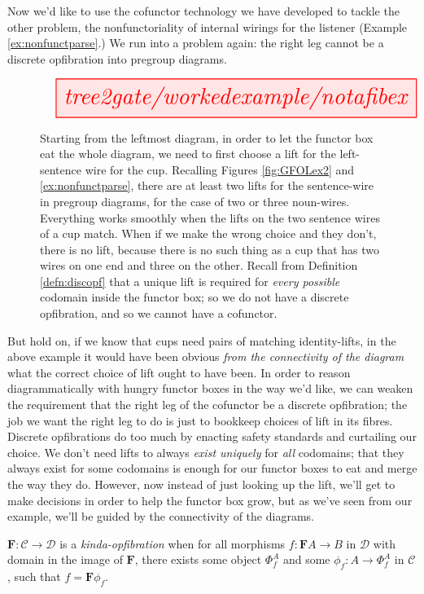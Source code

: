 Now we'd like to use the cofunctor technology we have developed to tackle the other problem, the nonfunctoriality of internal wirings for the listener (Example \ref{ex:nonfunctparse}.) We run into a problem again: the right leg cannot be a discrete opfibration into pregroup diagrams.

\begin{figure}[h!]\label{fig:notafibex}
\centering
\[\resizebox{\textwidth}{!}{\tikzfig{tree2gate/workedexample/notafibex}}\]
\caption{
Starting from the leftmost diagram, in order to let the functor box eat the whole diagram, we need to first choose a lift for the left-sentence wire for the cup. Recalling Figures \ref{fig:GFOLex2} and \ref{ex:nonfunctparse}, there are at least two lifts for the sentence-wire in pregroup diagrams, for the case of two or three noun-wires. Everything works smoothly when the lifts on the two sentence wires of a cup match. When if we make the wrong choice and they don't, there is no lift, because there is no such thing as a cup that has two wires on one end and three on the other. Recall from Definition \ref{defn:discopf} that a unique lift is required for \emph{every possible} codomain inside the functor box; so we do not have a discrete opfibration, and so we cannot have a cofunctor.
}
\end{figure}

But hold on, if we know that cups need pairs of matching identity-lifts, in the above example it would have been obvious \emph{from the connectivity of the diagram} what the correct choice of lift ought to have been. In order to reason diagrammatically with hungry functor boxes in the way we'd like, we can weaken the requirement that the right leg of the cofunctor be a discrete opfibration; the job we want the right leg to do is just to bookkeep choices of lift in its fibres. Discrete opfibrations do too much by enacting safety standards and curtailing our choice. We don't need lifts to always \emph{exist uniquely} for \emph{all} codomains; that they always exist for some codomains is enough for our functor boxes to eat and merge the way they do. However, now instead of just looking up the lift, we'll get to make decisions in order to help the functor box grow, but as we've seen from our example, we'll be guided by the connectivity of the diagrams.

\begin{defn}\label{defn:discopf}
$\mathbf{F}: \mathcal{C} \rightarrow \mathcal{D}$ is a \emph{kinda-opfibration} when for all morphisms $f: \mathbf{F}A \rightarrow B$ in $\mathcal{D}$ with domain in the image of $\mathbf{F}$, there exists some object $\Phi^A_f$ and some $\phi_f: A \rightarrow \Phi^A_f$ in $\mathcal{C}$, such that $f = \mathbf{F}\phi_f$.
\end{defn}

